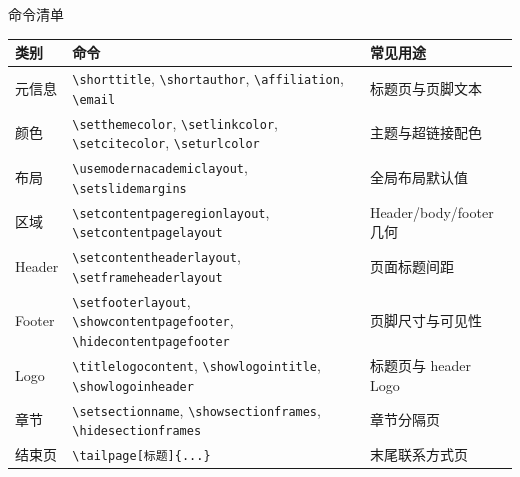\documentclass[aspectratio=169,10pt]{ctexbeamer}
\begin{document}
\begin{academicframe}[常用命令集中速查]{命令清单}
  \scriptsize
  \begin{tabular}{lll}
    \toprule
    类别 & 命令 & 常见用途 \\
    \midrule
    元信息 &
      \texttt{\textbackslash shorttitle}, \texttt{\textbackslash shortauthor}, \texttt{\textbackslash affiliation}, \texttt{\textbackslash email} &
      标题页与页脚文本 \\
    颜色 &
      \texttt{\textbackslash setthemecolor}, \texttt{\textbackslash setlinkcolor}, \texttt{\textbackslash setcitecolor}, \texttt{\textbackslash seturlcolor} &
      主题与超链接配色 \\
    布局 &
      \texttt{\textbackslash usemodernacademiclayout}, \texttt{\textbackslash setslidemargins} &
      全局布局默认值 \\
    区域 &
      \texttt{\textbackslash setcontentpageregionlayout}, \texttt{\textbackslash setcontentpagelayout} &
      Header/body/footer 几何 \\
    Header &
      \texttt{\textbackslash setcontentheaderlayout}, \texttt{\textbackslash setframeheaderlayout} &
      页面标题间距 \\
    Footer &
      \texttt{\textbackslash setfooterlayout}, \texttt{\textbackslash showcontentpagefooter}, \texttt{\textbackslash hidecontentpagefooter} &
      页脚尺寸与可见性 \\
    Logo &
      \texttt{\textbackslash titlelogocontent}, \texttt{\textbackslash showlogointitle}, \texttt{\textbackslash showlogoinheader} &
      标题页与 header Logo \\
    章节 &
      \texttt{\textbackslash setsectionname}, \texttt{\textbackslash showsectionframes}, \texttt{\textbackslash hidesectionframes} &
      章节分隔页 \\
    结束页 &
      \texttt{\textbackslash tailpage[标题]\{...\}} &
      末尾联系方式页 \\
    \bottomrule
  \end{tabular}
\end{academicframe}

\end{document}
